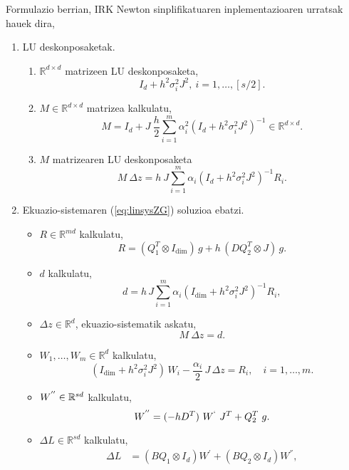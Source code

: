 Formulazio berrian, IRK Newton sinplifikatuaren inplementazioaren urratsak hauek dira,
\begin{enumerate}

\item LU deskonposaketak.
    \begin{enumerate}
     \item $\mathbb{R}^{d \times d}$ matrizeen LU deskonposaketa,
         \begin{equation*}
         I_d+h^2 \sigma_i^2 J^2, \ i=1,\dots,[s/2].
         \end{equation*}
     \item $M \in \mathbb{R}^{d \times d}$ matrizea kalkulatu,
         \begin{equation*}
          M=I_d+J \ \frac{h}{2}\sum\limits_{i=1}^{m} \alpha_i^2 (I_d+h^2 \sigma_i^2 J^2)^{-1} \in \mathbb{R}^{d \times d}.
         \end{equation*}
      \item $M$ matrizearen LU deskonposaketa
         \begin{equation*}
          M \ \Delta z=h \ J\sum\limits_{i=1}^{m}\alpha_i (I_d+h^2\sigma_i^2J^2)^{-1}R_i.
         \end{equation*}
    \end{enumerate}


\item Ekuazio-sistemaren (\ref{eq:linsysZG}) soluzioa ebatzi.
    \begin{itemize}
    \item $R \in \mathbb{R}^{md}$ kalkulatu,
    \begin{equation*}
     R=(Q_1^T  \otimes I_\dim) \, g + h \,  ( D Q_2^T \otimes J)\, g.
    \end{equation*}
    \item $d$ kalkulatu,
    \begin{equation*}
    d= h\, J \sum_{i=1}^{m} \alpha_i  (I_\dim +  h^2 \sigma_i^2 J^2)^{-1} R_i,
    \end{equation*}
    \item $\Delta z \in \mathbb{R}^d$, ekuazio-sistematik askatu,
    \begin{equation*}
    M \ \Delta z=d.
    \end{equation*} 
    \item $W_1, \dots, W_m \in \mathbb{R}^d$ kalkulatu,
    \begin{equation*}
    (I_\dim +  h^2 \sigma_i^2 J^2) \, W_i - \frac{\alpha_i}{2}\, J \, \Delta z = R_i, \quad i=1,\ldots,m.
    \end{equation*}
    \item $W^{''} \in \mathbb{R}^{sd}$ kalkulatu,
    \begin{equation*}
     W^{''} = (-hD^T) \ W^{`} \ J^T+Q_2^T \ g.
    \end{equation*}
     \item $\Delta L \in \mathbb{R}^{sd}$ kalkulatu,
     \begin{align*}
     \Delta L &=(B Q_1 \otimes I_d) W^{'}+(B Q_2 \otimes I_d) W^{''}, \\
     \end{align*}
    \end{itemize}


\end{enumerate}
